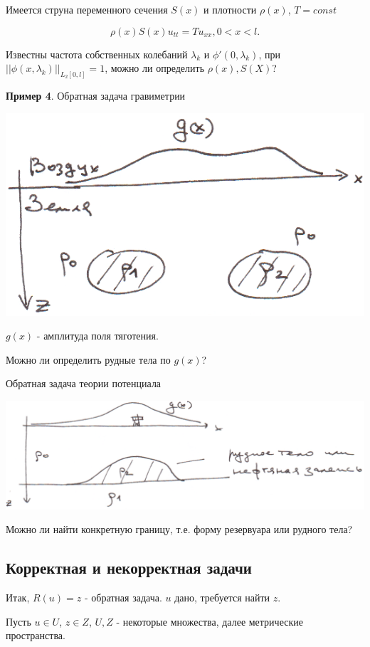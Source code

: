 \documentclass{article}
\begin{document}
Имеется струна переменного сечения $S(x)$ и плотности $\rho(x)$, $T = const$

$$ \rho(x) S(x) u_{tt} = T u_{xx}, 0 < x < l. $$

Известны частота собственных колебаний ${\lambda_k}$ и ${\phi'(0,\lambda_k)}$, при $|| \phi(x,\lambda_k)||_{L_2[0,l]}=1$, можно ли определить $\rho(x), S(X)$?

\bigskip

\textbf{Пример 4}. Обратная задача гравиметрии

\includegraphics[scale=0.6]{example4_1.png}

$g(x)$ - амплитуда поля тяготения. 

Можно ли определить рудные тела по $g(x)$?

\smallskip
Обратная задача теории потенциала

\includegraphics[scale=0.6]{example4_2.png}

Можно ли найти конкретную границу, т.е. форму резервуара или рудного тела?


\subsection*{Корректная и некорректная задачи}

Итак, $R(u) = z$ - обратная задача. $u$ дано, требуется найти $z$.

Пусть $u \in U$, $z \in Z$, $U,Z$ - некоторые множества, далее метрические пространства.
\end{document}
